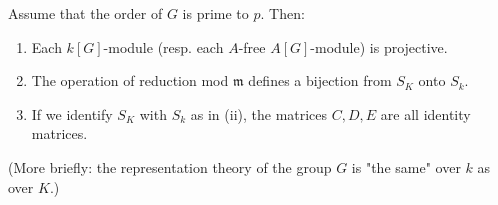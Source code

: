 Assume that the order of $G$ is prime to $p$. Then:

\begin{enumerate}
\item[(i)] Each $k[G]$-module (resp. each $A$-free $A[G]$-module) is projective.
\item[(ii)] The operation of reduction mod $\mathfrak{m}$ defines a bijection from $S_K$ onto $S_k$.
\item[(iii)] If we identify $S_K$ with $S_k$ as in (ii), the matrices $C, D, E$ are all identity matrices.
\end{enumerate}

(More briefly: the representation theory of the group $G$ is "the same" over $k$ as over $K$.)
